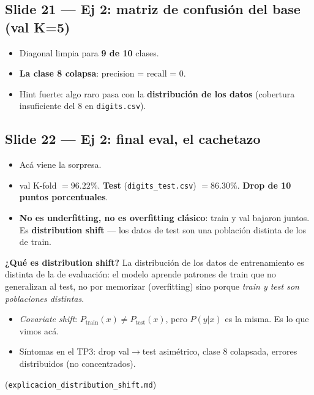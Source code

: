 \documentclass[11pt,a4paper]{article}
\newcommand{\nref}[1]{\textcolor{muted}{\small(\texttt{#1})}}
\begin{document}
\subsection{Slide 21 — Ej 2: matriz de confusión del base (val K=5)}

\begin{decir}
\begin{itemize}[leftmargin=*,topsep=0pt]
  \item Diagonal limpia para \textbf{9 de 10} clases.
  \item \textbf{La clase 8 colapsa}: precision = recall = 0.
  \item Hint fuerte: algo raro pasa con la \textbf{distribución de los datos}
        (cobertura insuficiente del 8 en \texttt{digits.csv}).
\end{itemize}
\end{decir}

\subsection{Slide 22 — Ej 2: final eval, el cachetazo}

\begin{decir}
\begin{itemize}[leftmargin=*,topsep=0pt]
  \item Acá viene la sorpresa.
  \item val K-fold $= 96.22\%$. \textbf{Test} (\texttt{digits\_test.csv})
        $= 86.30\%$. \textbf{Drop de 10 puntos porcentuales}.
  \item \textbf{No es underfitting, no es overfitting clásico}: train y val bajaron
        juntos. Es \textbf{distribution shift} — los datos de test son una
        población distinta de los de train.
\end{itemize}
\end{decir}

\begin{nota}
\textbf{¿Qué es distribution shift?} La distribución de los datos de
entrenamiento es distinta de la de evaluación: el modelo aprende patrones
de train que no generalizan al test, no por memorizar (overfitting) sino
porque \emph{train y test son poblaciones distintas}.
\begin{itemize}[leftmargin=*,topsep=2pt]
  \item \emph{Covariate shift}: $P_{\text{train}}(x) \neq P_{\text{test}}(x)$,
        pero $P(y|x)$ es la misma. Es lo que vimos acá.
  \item Síntomas en el TP3: drop val$\to$test asimétrico, clase 8 colapsada,
        errores distribuidos (no concentrados).
\end{itemize}
\nref{explicacion\_distribution\_shift.md}
\end{nota}
\end{document}
